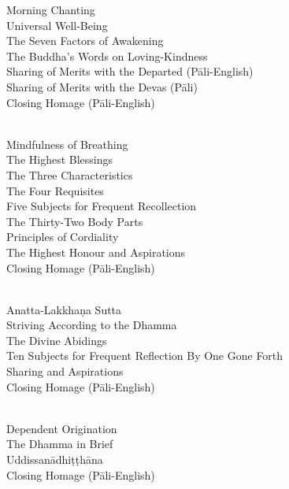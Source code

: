 \begin{center}
  Morning Chanting\\
  Universal Well-Being\\
  The Seven Factors of Awakening\\
  The Buddha’s Words on Loving-Kindness\\
  Sharing of Merits with the Departed (Pāli-English)\\
  Sharing of Merits with the Devas (Pāli)\\
  Closing Homage (Pāli-English)\\

  \bigskip

  {\libertinusFont\selectfont\textbf{\textsc{}}}\\

  Mindfulness of Breathing\\
  The Highest Blessings\\
  The Three Characteristics\\
  The Four Requisites\\
  Five Subjects for Frequent Recollection\\
  The Thirty-Two Body Parts\\
  Principles of Cordiality\\
  The Highest Honour and Aspirations\\
  Closing Homage (Pāli-English)\\

  \bigskip

  {\libertinusFont\selectfont\textbf{\textsc{}}}\\

  Anatta-Lakkhaṇa Sutta\\
  Striving According to the Dhamma\\
  The Divine Abidings\\
  Ten Subjects for Frequent Reflection By One Gone Forth\\
  Sharing and Aspirations\\
  Closing Homage (Pāli-English)\\

  \bigskip
  \clearpage

  {\libertinusFont\selectfont\textbf{\textsc{}}}\\

  Dependent Origination\\
  The Dhamma in Brief\\
  Uddissanādhiṭṭhāna\\
  Closing Homage (Pāli-English)\\


\end{center}
